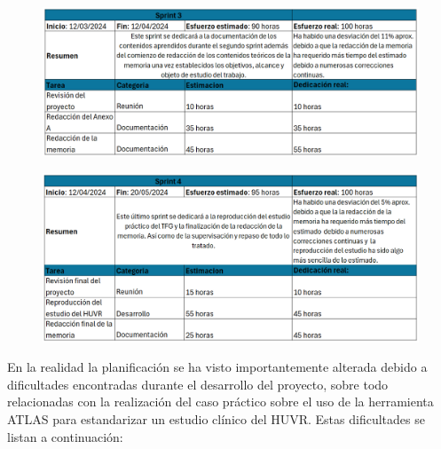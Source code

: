 \begin{figure}[H]
    \centering
    \includegraphics[width=1\textwidth]{tables/sprint3cap.png}
    \label{table:sprint3cap}
\end{figure}

\begin{figure}[H]
    \centering
    \includegraphics[width=1\textwidth]{tables/sprint4cap.png}
    \label{table:sprint4cap}
\end{figure}

En la realidad la planificación se ha visto importantemente alterada debido a dificultades encontradas durante el desarrollo del proyecto, sobre todo relacionadas con la realización del caso práctico sobre el uso de la herramienta ATLAS para estandarizar un estudio clínico del HUVR. Estas dificultades se listan a continuación:

